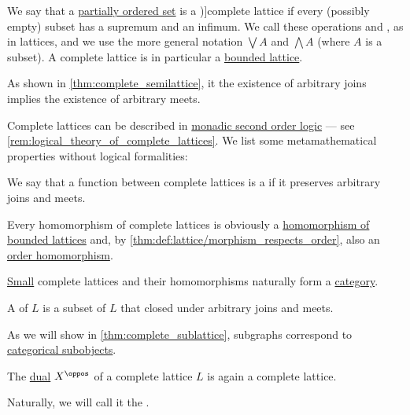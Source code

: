 \begin{definition}\label{def:complete_lattice}
  We say that a \hyperref[def:partially_ordered_set]{partially ordered set} is a \term[ru=полная (решётка) (\cite[133]{Гуров2013ТеорияРешёток})]{complete lattice} if every (possibly empty) subset has a supremum and an infimum. We call these operations  and , as in lattices, and we use the more general notation \( \bigvee A \) and \( \bigwedge A \) (where \( A \) is a subset). A complete lattice is in particular a \hyperref[def:bounded_lattice]{bounded lattice}.

  As shown in \cref{thm:complete_semilattice}, it the existence of arbitrary joins implies the existence of arbitrary meets.

  Complete lattices can be described in \hyperref[def:second_order_logic]{monadic second order logic} --- see \cref{rem:logical_theory_of_complete_lattices}. We list some metamathematical properties without logical formalities:
  \begin{thmenum}
    \mimprovised We say that a function between complete lattices is a  if it preserves arbitrary joins and meets.

    Every homomorphism of complete lattices is obviously a \hyperref[def:bounded_lattice/morphism]{homomorphism of bounded lattices} and, by \cref{thm:def:lattice/morphism_respects_order}, also an \hyperref[def:partially_ordered_set/morphism]{order homomorphism}.

     \hyperref[def:small_set]{Small} complete lattices and their homomorphisms naturally form a \hyperref[def:category]{category}.

     A  of \( L \) is a subset of \( L \) that closed under arbitrary joins and meets.

    As we will show in \cref{thm:complete_sublattice}, subgraphs correspond to \hyperref[def:categorical_subobject]{categorical subobjects}.

     The \hyperref[def:partially_ordered_set/opposite]{dual} \( X^\oppos \) of a complete lattice \( L \) is again a complete lattice.

    Naturally, we will call it the .
  \end{thmenum}
\end{definition}

